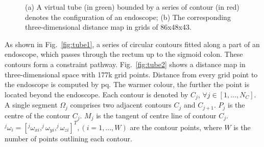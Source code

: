 \setcounter{subfigure}{0}
\begin{figure}[t!]
\centering
{}
\caption[(a) A virtual tube bounded by a series of contour denotes the configuration of an endoscope;
(b) The corresponding three-dimensional distance map in grids of 86x48x43.]{(a) A virtual tube (in green) bounded by a series of contour (in red) denotes the configuration of an endoscope;
(b) The corresponding three-dimensional distance map in grids of 86x48x43.}
\label{fig:tube}
\end{figure}

As shown in Fig.~\ref{fig:tube1}, a series of circular contours fitted along a part of an endoscope, which passes through the rectum up to the sigmoid colon. 
These contours form a constraint pathway. 
Fig.~\ref{fig:tube2} shows a distance map in three-dimensional space with 177k grid points. 
Distance from every grid point to the endoscope is computed by \gls{pq}. 
The warmer colour, the further the point is located beyond the endoscope.
Each contour is denoted by $C_j$, $\forall j \in [1,...,N_C]$.
A single segment $\Omega_j$ comprises two adjacent contours $C_j$ and $C_{j+1}$.
$P_j$ is the centre of the contour $C_j$.
$M_j$ is the tangent of centre line of contour $C_j$.
$^j\omega_i=[^j\omega_{xi},^j\omega_{yi},^j\omega_{zi}]^T, (i=1,...,W)$ are the contour points,
where $W$ is the number of points outlining each contour.

